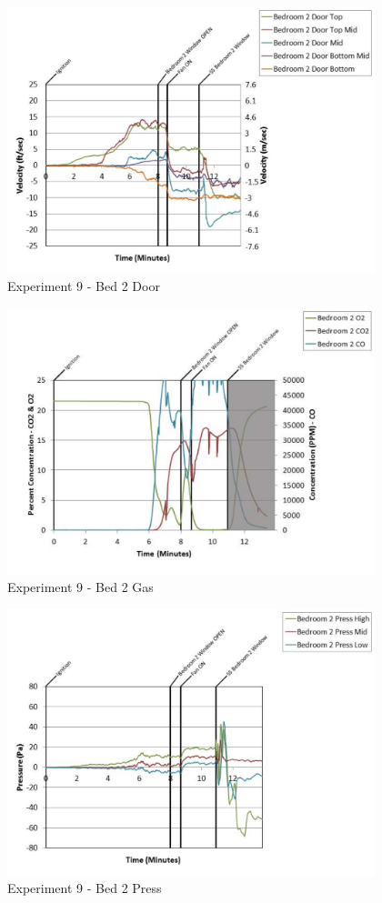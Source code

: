 \documentclass{article}
\begin{document}
\begin{appendices}
	\begin{figure}[h!]
		\centering
		\includegraphics[height=3.05in]{0_Images/Results_Charts/Exp_9_Charts/Bed2Door.pdf}
		\caption{Experiment 9 - Bed 2 Door}
	\end{figure}
 
	\clearpage

	\begin{figure}[h!]
		\centering
		\includegraphics[height=3.05in]{0_Images/Results_Charts/Exp_9_Charts/Bed2Gas.pdf}
		\caption{Experiment 9 - Bed 2 Gas}
	\end{figure}
 

	\begin{figure}[h!]
		\centering
		\includegraphics[height=3.05in]{0_Images/Results_Charts/Exp_9_Charts/Bed2Press.pdf}
		\caption{Experiment 9 - Bed 2 Press}
	\end{figure}
 

\end{appendices}
\end{document}
